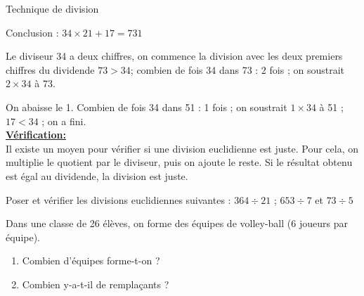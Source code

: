 \begin{mymethname}{Technique de division}
\begin{multicols}{2}
	\begin{center}
	\end{center}

Conclusion : $34 \times 21 + 17 = 731$
\end{multicols}


Le diviseur 34 a deux chiffres, on commence la division avec les deux premiers chiffres du dividende $73 > 34 $; 
combien de fois 34 dans 73 : 2 fois ; on soustrait $2 \times 34$ à 73.

On abaisse le 1. 
Combien de fois 34 dans 51 : 1 fois ; 
on soustrait $1 \times 34$ à 51 ; $17 < 34$ ; on a fini.\\


\textbf{\underline{Vérification:}}\\
Il existe un moyen pour vérifier si une division euclidienne est juste. 
Pour cela, on multiplie le quotient par le diviseur, puis on ajoute le reste. 
Si le résultat obtenu est égal au dividende, la division est juste.
\end{mymethname}


\begin{myexs}
	Poser et vérifier les divisions euclidiennes suivantes : $364 \div 21$ ; $653 \div 7$ et $73 \div 5$
	
	\vspace*{4cm} 
\end{myexs}

\begin{mypb}
	Dans une classe de 26 élèves, on forme des équipes de volley-ball (6 joueurs par équipe).
	
	\begin{enumerate}
		\item Combien d’équipes forme-t-on ?
		\item Combien y-a-t-il de remplaçants ?	
	\end{enumerate}

\vspace*{5cm} 	
\end{mypb}